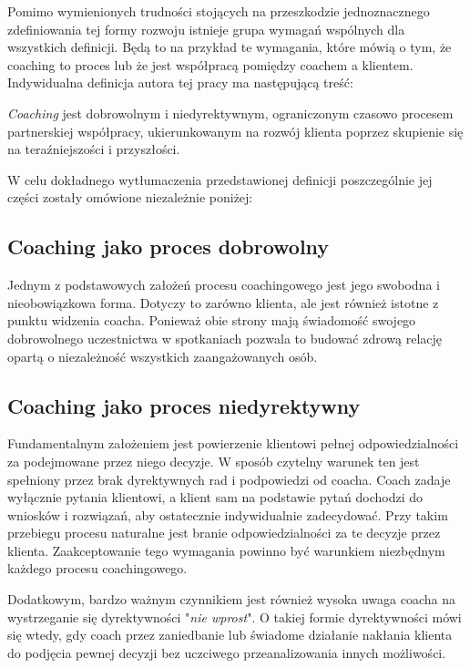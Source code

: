Pomimo wymienionych trudności stojących na przeszkodzie jednoznacznego zdefiniowania tej formy rozwoju istnieje grupa wymagań wspólnych dla
wszystkich definicji. Będą to na przykład te wymagania, które mówią o tym, że coaching to proces lub że jest współpracą pomiędzy
coachem a klientem. Indywidualna definicja autora tej pracy ma następującą treść:
\begin{defn}
  \emph{Coaching} jest dobrowolnym i niedyrektywnym, ograniczonym czasowo procesem partnerskiej współpracy,
  ukierunkowanym na rozwój klienta poprzez skupienie się na teraźniejszości i przyszłości.
  \label{definicja}
\end{defn}

W celu dokładnego wytłumaczenia przedstawionej definicji poszczególnie jej części zostały omówione niezależnie poniżej:

\subsection{Coaching jako proces dobrowolny}
Jednym z podstawowych założeń procesu coachingowego jest jego swobodna i nieobowiązkowa forma. Dotyczy to zarówno klienta, ale jest
również istotne z punktu widzenia coacha. Ponieważ obie strony mają świadomość swojego dobrowolnego uczestnictwa w spotkaniach pozwala to budować
zdrową relację opartą o niezależność wszystkich zaangażowanych osób.

\subsection{Coaching jako proces niedyrektywny}
Fundamentalnym założeniem jest powierzenie klientowi pełnej odpowiedzialności za podejmowane przez niego decyzje. W sposób czytelny
warunek ten jest spełniony przez brak dyrektywnych rad i podpowiedzi od coacha. Coach zadaje wyłącznie pytania klientowi,
a klient sam na podstawie pytań dochodzi do wniosków i rozwiązań, aby ostatecznie indywidualnie zadecydować. Przy takim przebiegu procesu naturalne jest branie odpowiedzialności
za te decyzje przez klienta. Zaakceptowanie tego wymagania powinno być warunkiem niezbędnym każdego procesu coachingowego.

Dodatkowym, bardzo ważnym czynnikiem jest również wysoka uwaga coacha na wystrzeganie się dyrektywności "\emph{nie wprost}". O takiej formie
dyrektywności mówi się wtedy, gdy coach przez zaniedbanie lub świadome działanie nakłania klienta do podjęcia pewnej decyzji bez uczciwego przeanalizowania
innych możliwości. \\

